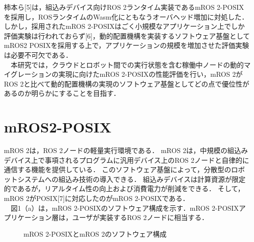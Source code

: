 \documentclass[11pt]{ujarticle}
\begin{document}
柿本ら[5]は，組込みデバイス向けROS 2ランタイム実装であるmROS 2-POSIXを採用し，ROSランタイムのWasm化にともなうオーバヘッド増加に対処した．
しかし，採用されたmROS 2-POSIXはごく小規模なアプリケーション上でしか評価実験は行われておらず[6]，動的配置機構を実装するソフトウェア基盤としてmROS2 POSIXを採用する上で，アプリケーションの規模を増加させた評価実験は必要不可欠である．
\\　本研究では，クラウドとロボット間での実行状態を含む稼働中ノードの動的マイグレーションの実現に向けたmROS 2-POSIXの性能評価を行い，mROS 2がROS 2と比べて動的配置機構の実現のソフトウェア基盤としてどの点で優位性があるのか明らかにすることを目指す．



\section{mROS2-POSIX}
mROS 2は，ROS 2ノードの軽量実行環境である．
mROS 2は，中規模の組込みデバイス上で事項されるプログラムに汎用デバイス上のROS 2ノードと自律的に通信する機能を提供している．
このソフトウェア基盤によって，分散型のロボットシステムへの組込み技術の導入できる．
組込みデバイスは計算資源が限定的であるが，リアルタイム性の向上および消費電力が削減をできる．
そして，mROS 2がPOSIX[7]に対応したのがmROS 2-POSIXである．
\\　図1（a）は，mROS 2-POSIXのソフトウェア構成を示す．mROS 2-POSIXアプリケーション層は，ユーザが実装するROS 2ノードに相当する．
\begin{figure}[t]
	\centering
	\begin{minipage}{.5\textwidth}
		\centering
		\hfill
	\end{minipage}
	\caption{mROS 2-POSIXとmROS 2のソフトウェア構成}
	
\end{figure}
\end{document}
